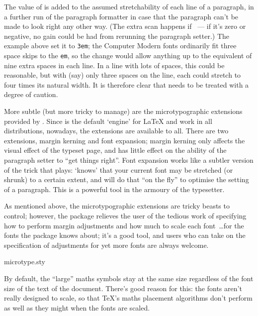 The value of  is added to the assumed
stretchability of each line of a paragraph, in a further run of the
paragraph formatter in case that the paragraph can't be made to look
right any other way.  (The extra scan happens if
~--- if it's zero or negative, no gain
could be had from rerunning the paragraph setter.)  The example above
set it to \texttt{3em}; the Computer Modern fonts ordinarily fit three
space skips to the \texttt{em}, so the change would allow anything up
to the equivalent of nine extra spaces in each line.  In a line with
lots of spaces, this could be reasonable, but with (say) only three
spaces on the line, each could stretch to four times its natural
width.  It is therefore clear that  needs to be
treated with a degree of caution.

More subtle (but more tricky to manage) are the microtypographic
extensions provided by \PDFTeX{}.  Since \PDFTeX{} is the default
`engine' for \LaTeX{} and \CONTeXT{} work in all distributions,
nowadays, the extensions are available to all.  There are two
extensions, margin kerning and font expansion; margin kerning only
affects the visual effect of the typeset page, and has little effect
on the ability of the paragraph setter to ``get things right''.
Font expansion works like a subtler version of the trick that
 plays: \PDFTeX{} `knows' that your current font
may be stretched (or shrunk) to a certain extent, and will do that
``on the fly'' to optimise the setting of a paragraph.  This is a
powerful tool in the armoury of the typesetter.

As mentioned above, the microtypographic extensions are tricky beasts
to control; however, the  package relieves the user
of the tedious work of specifying how to perform margin adjustments
and how much to scale each font~\dots{}\@ for the fonts the package
knows about; it's a good tool, and users who can take on the
specification of adjustments for yet more fonts are always welcome.
\begin{ctanrefs}
\item[microtype.sty]
\end{ctanrefs}


By default, the ``large'' maths symbols stay at the same size
regardless of the font size of the text of the document.  There's good
reason for this: the  fonts aren't really designed to
scale, so that \TeX{}'s maths placement algorithms don't perform as
well as they might when the fonts are scaled.

